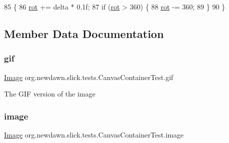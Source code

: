 \begin{DoxyCode}
85                                                            \{
86         \mbox{\hyperlink{classorg_1_1newdawn_1_1slick_1_1tests_1_1_canvas_container_test_a330cd20f94bab9b77c601d707256dc62}{rot}} += delta * 0.1f;
87         \textcolor{keywordflow}{if} (\mbox{\hyperlink{classorg_1_1newdawn_1_1slick_1_1tests_1_1_canvas_container_test_a330cd20f94bab9b77c601d707256dc62}{rot}} > 360) \{
88             \mbox{\hyperlink{classorg_1_1newdawn_1_1slick_1_1tests_1_1_canvas_container_test_a330cd20f94bab9b77c601d707256dc62}{rot}} -= 360;
89         \}
90     \}
\end{DoxyCode}


\subsection{Member Data Documentation}
\mbox{\label{classorg_1_1newdawn_1_1slick_1_1tests_1_1_canvas_container_test_a71f9f7b72559e875d884ee0464bfafef}} 
\subsubsection{\texorpdfstring{gif}{gif}}
{\footnotesize\ttfamily \mbox{\hyperlink{classorg_1_1newdawn_1_1slick_1_1_image}{Image}} org.\+newdawn.\+slick.\+tests.\+Canvas\+Container\+Test.\+gif\hspace{0.3cm}{\ttfamily [private]}}

The G\+IF version of the image \mbox{\label{classorg_1_1newdawn_1_1slick_1_1tests_1_1_canvas_container_test_ab4b36d2c86487188a6813d9ea094ea78}} 
\subsubsection{\texorpdfstring{image}{image}}
{\footnotesize\ttfamily \mbox{\hyperlink{classorg_1_1newdawn_1_1slick_1_1_image}{Image}} org.\+newdawn.\+slick.\+tests.\+Canvas\+Container\+Test.\+image\hspace{0.3cm}{\ttfamily [private]}}


